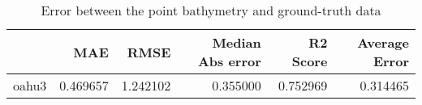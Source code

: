 \begin{table}[h!]
\caption{Error between the point bathymetry and ground-truth data}
\label{tab:oahu3_lidar_error}
\begin{tabular}{lrrrrr}
\toprule
 & MAE & RMSE & Median Abs error & R2 Score & Average Error \\
\midrule
oahu3 & 0.469657 & 1.242102 & 0.355000 & 0.752969 & 0.314465 \\
\bottomrule
\end{tabular}
\end{table}
